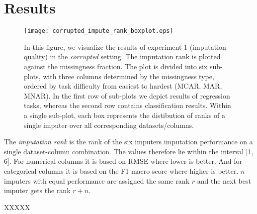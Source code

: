 \graphicspath{ {figures/} } %


\section{Results}


\begin{figure}\centering
    \texttt{[image: corrupted\_impute\_rank\_boxplot.eps]}
    \caption[Corrupted imputation ranks]{In this figure, we visualize the results of experiment 1 (imputation quality) in the \textit{corrupted} setting. The imputation rank is plotted against the missingness fraction. The plot is divided into six sub-plots, with three columns determined by the missingness type, ordered by task difficulty from easiest to hardest (MCAR, MAR, MNAR). In the first row of sub-plots we depict results of regression tasks, whereas the second row contains classification results. Within a single sub-plot, each box represents the distibution of ranks of a single imputer over all corresponding datasets/columns.}\label{fig:corrupted_impute_rank_boxplot}
\end{figure}

The \textit{imputation rank} is the rank of the six imputers imputation performance on a single dataset-column combination. The values therefore lie within the interval [1, 6]. For numerical columns it is based on RMSE where lower is better. And for categorical columns it is based on the F1 macro score where higher is better. $n$ imputers with equal performance are assigned the same rank $r$ and the next best imputer gets the rank $r+n$.

XXXXX
